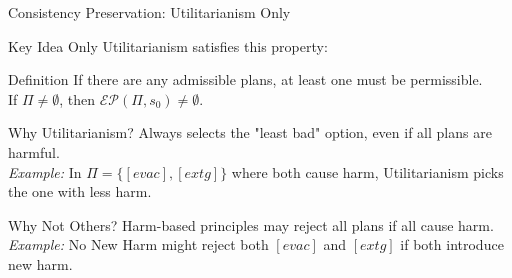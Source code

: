 \documentclass[compress,xcolor=table]{beamer}
\begin{document}
\begin{frame}{Consistency Preservation: Utilitarianism Only}
    \begin{block}{Key Idea}
        Only Utilitarianism satisfies this property:
    \end{block}
    \tiny
    \begin{block}{Definition}
        If there are any admissible plans, at least one must be permissible.\\
        If $\Pi \neq \emptyset$, then $\mathcal{EP}(\Pi, s_0) \neq \emptyset$.
    \end{block}

    \begin{block}{Why Utilitarianism?}
        Always selects the "least bad" option, even if all plans are harmful.\\
        \textit{Example:} In $\Pi = \{[evac], [extg]\}$ where both cause harm, Utilitarianism picks the one with less harm.
    \end{block}

    \begin{block}{Why Not Others?}
        Harm-based principles may reject all plans if all cause harm.\\
        \textit{Example:} No New Harm might reject both $[evac]$ and $[extg]$ if both introduce new harm.
    \end{block}
\end{frame}
\end{document}
